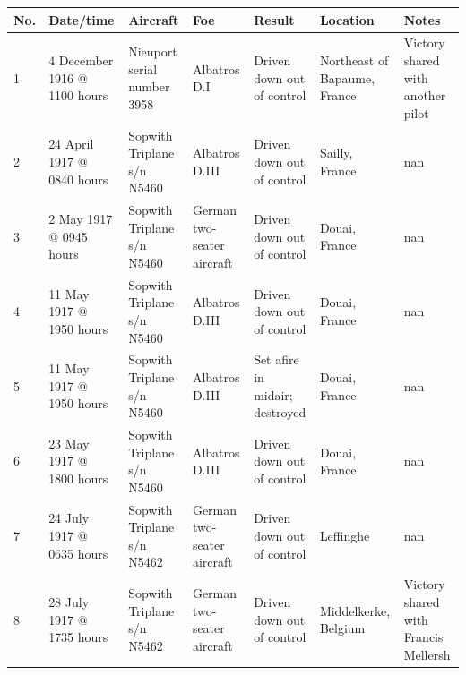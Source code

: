 \documentclass{article}
\begin{document}
\begin{tabular}{lllllll}
\toprule
No. & Date/time & Aircraft & Foe & Result & Location & Notes \\
\midrule
1 & 4 December 1916 @ 1100 hours & Nieuport serial number 3958 & Albatros D.I & Driven down out of control & Northeast of Bapaume, France & Victory shared with another pilot \\
2 & 24 April 1917 @ 0840 hours & Sopwith Triplane s/n N5460 & Albatros D.III & Driven down out of control & Sailly, France & nan \\
3 & 2 May 1917 @ 0945 hours & Sopwith Triplane s/n N5460 & German two-seater aircraft & Driven down out of control & Douai, France & nan \\
4 & 11 May 1917 @ 1950 hours & Sopwith Triplane s/n N5460 & Albatros D.III & Driven down out of control & Douai, France & nan \\
5 & 11 May 1917 @ 1950 hours & Sopwith Triplane s/n N5460 & Albatros D.III & Set afire in midair; destroyed & Douai, France & nan \\
6 & 23 May 1917 @ 1800 hours & Sopwith Triplane s/n N5460 & Albatros D.III & Driven down out of control & Douai, France & nan \\
7 & 24 July 1917 @ 0635 hours & Sopwith Triplane s/n N5462 & German two-seater aircraft & Driven down out of control & Leffinghe & nan \\
8 & 28 July 1917 @ 1735 hours & Sopwith Triplane s/n N5462 & German two-seater aircraft & Driven down out of control & Middelkerke, Belgium & Victory shared with Francis Mellersh \\
\bottomrule
\end{tabular}
\end{document}
